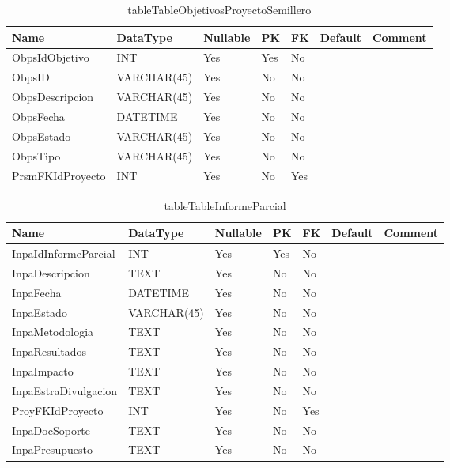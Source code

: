\begin{table}
	\caption{tableTableObjetivosProyectoSemillero}
	\label{labelTableObjetivosProyectoSemillero}
	\begin{tabular}{ |l|l|l|l|l|l|l| }
		\hline
		Name & DataType & Nullable & PK & FK & Default & Comment \\ \hline
		ObpsIdObjetivo & INT & Yes & Yes & No &  & \\ \hline 
		ObpsID & VARCHAR(45) & Yes & No & No &  & \\ \hline 
		ObpsDescripcion & VARCHAR(45) & Yes & No & No &  & \\ \hline 
		ObpsFecha & DATETIME & Yes & No & No &  & \\ \hline 
		ObpsEstado & VARCHAR(45) & Yes & No & No &  & \\ \hline 
		ObpsTipo & VARCHAR(45) & Yes & No & No &  & \\ \hline 
		PrsmFKIdProyecto & INT & Yes & No & Yes &  & \\ \hline 
		
	\end{tabular}
\end{table}


\begin{table}
	\caption{tableTableInformeParcial}
	\label{labelTableInformeParcial}
	\begin{tabular}{ |l|l|l|l|l|l|l| }
		\hline
		Name & DataType & Nullable & PK & FK & Default & Comment \\ \hline
		InpaIdInformeParcial & INT & Yes & Yes & No &  & \\ \hline 
		InpaDescripcion & TEXT & Yes & No & No &  & \\ \hline 
		InpaFecha & DATETIME & Yes & No & No &  & \\ \hline 
		InpaEstado & VARCHAR(45) & Yes & No & No &  & \\ \hline 
		InpaMetodologia & TEXT & Yes & No & No &  & \\ \hline 
		InpaResultados & TEXT & Yes & No & No &  & \\ \hline 
		InpaImpacto & TEXT & Yes & No & No &  & \\ \hline 
		InpaEstraDivulgacion & TEXT & Yes & No & No &  & \\ \hline 
		ProyFKIdProyecto & INT & Yes & No & Yes &  & \\ \hline 
		InpaDocSoporte & TEXT & Yes & No & No &  & \\ \hline 
		InpaPresupuesto & TEXT & Yes & No & No &  & \\ \hline 
		
	\end{tabular}
\end{table}


